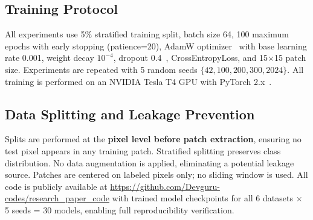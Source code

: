 \documentclass[conference]{IEEEtran}
\begin{document}
\begin{table}[!t]
\caption{Benchmark HSI Datasets}
\label{tab:datasets}
\centering
{}
\end{table}

\subsection{Training Protocol}

All experiments use 5\% stratified training split, batch size 64, 100 maximum epochs with early stopping (patience=20), AdamW optimizer~\cite{loshchilov2019decoupled} with base learning rate 0.001, weight decay $10^{-4}$, dropout 0.4~\cite{srivastava2014dropout}, CrossEntropyLoss, and 15$\times$15 patch size. Experiments are repeated with 5 random seeds $\{42, 100, 200, 300, 2024\}$. All training is performed on an NVIDIA Tesla T4 GPU with PyTorch 2.x~\cite{paszke2019pytorch}.

\subsection{Data Splitting and Leakage Prevention}

Splits are performed at the \textbf{pixel level before patch extraction}, ensuring no test pixel appears in any training patch. Stratified splitting preserves class distribution. No data augmentation is applied, eliminating a potential leakage source. Patches are centered on labeled pixels only; no sliding window is used. All code is publicly available at \url{https://github.com/Devguru-codes/research_paper_code} with trained model checkpoints for all 6 datasets $\times$ 5 seeds = 30 models, enabling full reproducibility verification.
\end{document}
